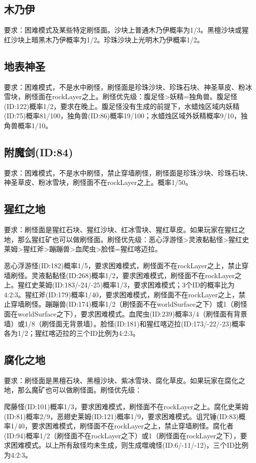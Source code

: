 \subsection{木乃伊}
要求：困难模式及某些特定刷怪面。沙块上普通木乃伊概率为1/3。黑檀沙块或猩红沙块上暗黑木乃伊概率为1/2。珍珠沙块上光明木乃伊概率1/2。

\subsection{地表神圣}
要求：困难模式，不是水中刷怪，刷怪面是珍珠沙块、珍珠石块、神圣草皮、粉冰雪块，刷怪面在rockLayer之上。刷怪优先级：腹足怪>妖精=独角兽。腹足怪(ID:122)概率1/2，要求在晚上。腹足怪没有生成的前提下，水蜡烛区域内妖精(ID:75)概率81/100，独角兽(ID:86)概率19/100；水蜡烛区域外妖精概率9/10，独角兽概率1/10。

\subsection{附魔剑(ID:84)}
要求：困难模式，不是水中刷怪，禁止穿墙刷怪，刷怪面是珍珠沙块、珍珠石块、神圣草皮、粉冰雪块，刷怪面不在rockLayer之上。概率1/50。

\subsection{猩红之地}
要求：刷怪面是猩红石块、猩红沙块、红冰雪块、猩红草皮。如果玩家在猩红之地，那么猩红矿也可以做刷怪面。刷怪优先级：恶心浮游怪>灵液黏黏怪>猩红史莱姆>猩红斧>蹦蹦兽>血爬虫>脸怪=猩红喀迈拉。

恶心浮游怪(ID:182)概率1/5，要求困难模式，刷怪面不在rockLayer之上，禁止穿墙刷怪。灵液黏黏怪(ID:268)概率1/2，要求困难模式，刷怪面不在rockLayer之上。猩红史莱姆(ID:183/-24/-25)概率1/3，要求困难模式；3个ID的概率比为4:2:3。猩红斧(ID:179)概率1/40，要求困难模式，刷怪面不在rockLayer之上，禁止穿墙刷怪。蹦蹦兽(ID:174)概率1/2（刷怪面不在worldSurface之下）或1（刷怪面在worldSurface之下），要求困难模式。血爬虫(ID:239)概率3/4（刷怪面有背景墙）或1/8（刷怪面无背景墙）。脸怪(ID:181)和猩红喀迈拉(ID:173/-22/-23)概率各为1/2；猩红喀迈拉的三个ID比例为4:2:3。

\subsection{腐化之地}
要求：刷怪面是黑檀石块、黑檀沙块、紫冰雪块、腐化草皮。如果玩家在腐化之地，那么魔矿也可以做刷怪面。刷怪优先级：

爬藤怪(ID:101)概率1/3，要求困难模式，刷怪面不在rockLayer之上。腐化史莱姆(ID:81)概率2/9，恶翅史莱姆(ID:121)概率1/9，要求困难模式。诅咒锤(ID:83)概率1/40，要求困难模式，刷怪面不在rockLayer之上，禁止穿墙刷怪。腐化者(ID:94)概率1/2（刷怪面不在rockLayer之下）或1（刷怪面在rockLayer之下），要求困难模式。以上所有敌怪均未生成，则生成噬魂怪(ID:6/-11/-12)，三个ID比例为4:2:3。

